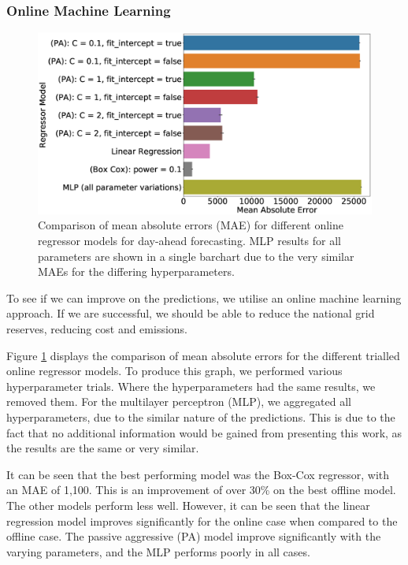 \subsubsection{Online Machine Learning}

\begin{figure}
	\centering
	\includegraphics[width=0.65\columnwidth]{Chapter5/figures/market-forecasting/results/online_model_mae_barplot.eps}
	\caption{Comparison of mean absolute errors (MAE) for different online regressor models for day-ahead forecasting. MLP results for all parameters are shown in a single barchart due to the very similar MAEs for the differing hyperparameters.}
	\label{fig:online_model_mae_barplot}
\end{figure}



To see if we can improve on the predictions, we utilise an online machine learning approach. If we are successful, we should be able to reduce the national grid reserves, reducing cost and emissions.


Figure \ref{fig:online_model_mae_barplot} displays the comparison of mean absolute errors for the different trialled online regressor models. To produce this graph, we performed various hyperparameter trials. Where the hyperparameters had the same results, we removed them. For the multilayer perceptron (MLP), we aggregated all hyperparameters, due to the similar nature of the predictions. This is due to the fact that no additional information would be gained from presenting this work, as the results are the same or very similar.

It can be seen that the best performing model was the Box-Cox regressor, with an MAE of 1,100. This is an improvement of over 30\% on the best offline model. The other models perform less well. However, it can be seen that the linear regression model improves significantly for the online case when compared to the offline case. The passive aggressive (PA) model improve significantly with the varying parameters, and the MLP performs poorly in all cases.



